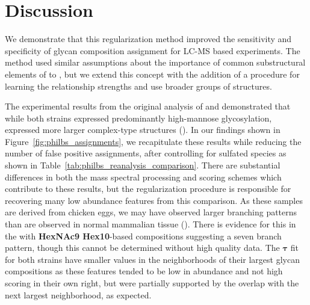 \section{Discussion}

    We demonstrate that this regularization method improved the
    sensitivity and specificity of glycan composition assignment for
    LC-MS based experiments. The method used similar
    assumptions about the importance of common substructural elements
    of \nglycans to \cite{Goldberg2009}, but we extend this concept
    with the addition of a procedure for learning the relationship
    strengths and use broader groups of structures.

    The experimental results from the original analysis of \philbs and
     demonstrated that while both strains expressed predominantly
    high-mannose glycosylation, \philbs expressed more larger complex-type
    structures (\cite{Khatri2016a}). In our findings shown in Figure~\ref{fig:philbs_assignments},
    we recapitulate these results while reducing the number of false positive
    assignments, after controlling for sulfated species as shown in
    Table~\ref{tab:philbs_reanalysis_comparison}. There are substantial
    differences in both the mass spectral processing and scoring schemes which
    contribute to these results, but the regularization procedure is responsible
    for recovering many low abundance features from this comparison. As these
    samples are derived from chicken eggs, we may have observed larger
    branching patterns than are observed in normal mammalian tissue (\cite{Stanley2009}).
    There is evidence for this in the \philbs with \textbf{HexNAc9 Hex10}-based compositions suggesting
    a seven branch pattern, though this cannot be determined without high quality
    \msn data. The $\mathbf{\tau}$ fit for both strains have smaller values
    in the neighborhoods of their largest glycan compositions as these
    features tended to be low in abundance and not high scoring in their
    own right, but were partially supported by the overlap with the next
    largest neighborhood, as expected.

